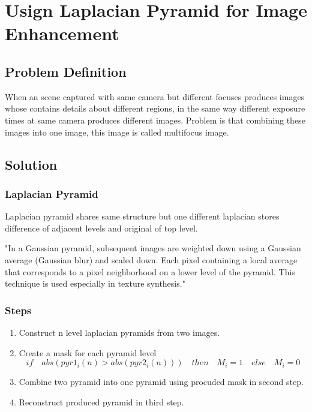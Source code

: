 \documentclass[12pt]{article}
\begin{document}

\tableofcontents
\pagebreak


\section{Usign Laplacian Pyramid for Image Enhancement}
\subsection{Problem Definition}
When an scene captured with same camera but different focuses produces images whose contains details about different regions, in the same way different exposure times at same camera produces different images. Problem is that combining these images into one image, this image is called multifocus image.

\subsection{Solution}
\subsubsection{Laplacian Pyramid}
Laplacian pyramid shares same structure but one different laplacian stores difference of adjacent levels and original of top level.

"In a Gaussian pyramid, subsequent images are weighted down using a Gaussian average (Gaussian blur) and scaled down. Each pixel containing a local average that corresponds to a pixel neighborhood on a lower level of the pyramid. This technique is used especially in texture synthesis." \cite{1}
\subsubsection{Steps}
\begin{enumerate}
\item Construct n level laplacian pyramids from two images.
\item{ Create a mask for each pyramid level
	\begin{equation*}
	  if\quad abs(pyr1_i(n) > abs(pyr2_i(n))) \quad then \quad M_i = 1 \quad else \quad M_i = 0
	\end{equation*}
     } 
\item Combine two pyramid into one pyramid using procuded mask in second step.
\item Reconstruct produced pyramid in third step.
\end{enumerate}
\end{document}
